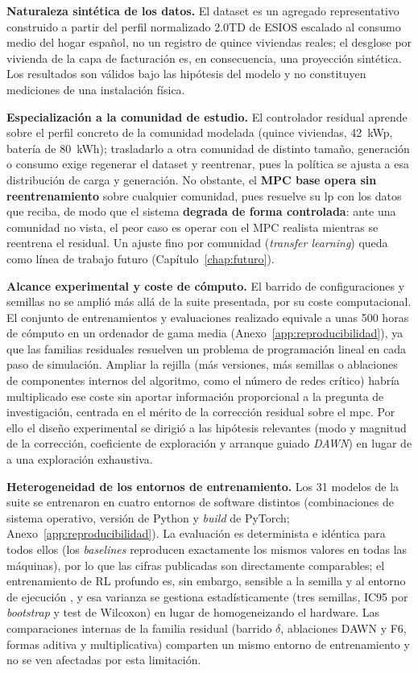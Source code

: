 \documentclass[12pt, a4paper, twoside]{report}
\begin{document}
\textbf{Naturaleza sintética de los datos.} El dataset es un agregado
representativo construido a partir del perfil normalizado 2.0TD de ESIOS escalado
al consumo medio del hogar español, no un registro de quince viviendas reales; el
desglose por vivienda de la capa de facturación es, en consecuencia, una
proyección sintética. Los resultados son válidos bajo las hipótesis del modelo y
no constituyen mediciones de una instalación física.

\textbf{Especialización a la comunidad de estudio.} El controlador residual aprende
sobre el perfil concreto de la comunidad modelada (quince viviendas, \SI{42}{kWp},
batería de \SI{80}{kWh}); trasladarlo a otra comunidad de distinto tamaño,
generación o consumo exige regenerar el dataset y reentrenar, pues la política se
ajusta a esa distribución de carga y generación. No obstante, el \textbf{MPC base
opera sin reentrenamiento} sobre cualquier comunidad, pues resuelve su \acrshort{lp}
con los datos que reciba, de modo que el sistema \textbf{degrada de forma controlada}:
ante una comunidad no vista, el peor caso es operar con el MPC realista mientras se
reentrena el residual. Un ajuste fino por comunidad (\textit{transfer learning})
queda como línea de trabajo futuro (Capítulo~\ref{chap:futuro}).

\textbf{Alcance experimental y coste de cómputo.} El barrido de configuraciones y
semillas no se amplió más allá de la suite presentada, por su coste computacional.
El conjunto de entrenamientos y evaluaciones realizado equivale a unas 500 horas de
cómputo en un ordenador de gama media (Anexo~\ref{app:reproducibilidad}), ya que
las familias residuales resuelven un
problema de programación lineal en cada paso de simulación. Ampliar la rejilla (más
versiones, más semillas o ablaciones de componentes internos del algoritmo, como el
número de redes crítico) habría multiplicado ese coste sin aportar información
proporcional a la pregunta de investigación, centrada en el mérito de la corrección
residual sobre el \acrshort{mpc}. Por ello el diseño experimental se dirigió a las
hipótesis relevantes (modo y magnitud de la corrección, coeficiente de exploración y
arranque guiado \textit{DAWN}) en lugar de a una exploración exhaustiva.

\textbf{Heterogeneidad de los entornos de entrenamiento.} Los 31 modelos de la
suite se entrenaron en cuatro entornos de software distintos (combinaciones de
sistema operativo, versión de Python y \textit{build} de PyTorch;
Anexo~\ref{app:reproducibilidad}). La evaluación es determinista e idéntica
para todos ellos (los \textit{baselines} reproducen exactamente los mismos
valores en todas las máquinas), por lo que las cifras publicadas son
directamente comparables; el entrenamiento de RL profundo es, sin embargo,
sensible a la semilla y al entorno de ejecución \citep{Henderson2017}, y esa
varianza se gestiona estadísticamente (tres semillas, IC95 por
\textit{bootstrap} y test de Wilcoxon) en lugar de homogeneizando el hardware.
Las comparaciones internas de la familia residual (barrido $\delta$,
ablaciones DAWN y F6, formas aditiva y multiplicativa) comparten un mismo
entorno de entrenamiento y no se ven afectadas por esta limitación.
\end{document}
